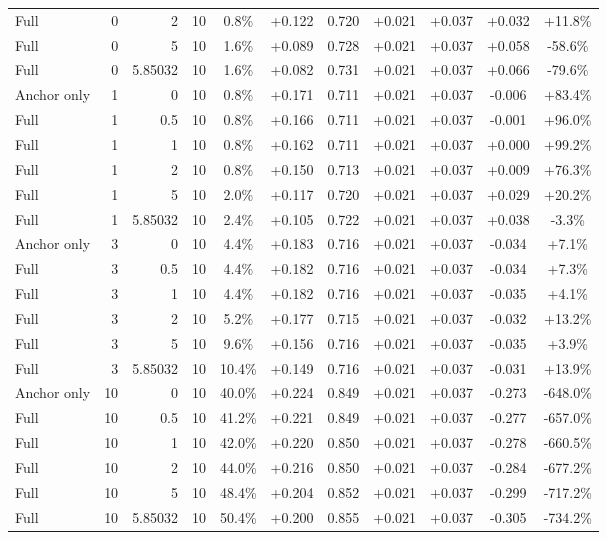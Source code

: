 \begin{table}[htbp]
\begin{tabular}{lrrrccccccc}
Full & 0 & 2 & 10 & 0.8\% & +0.122 & 0.720 & +0.021 & +0.037 & +0.032 & +11.8\% \\
Full & 0 & 5 & 10 & 1.6\% & +0.089 & 0.728 & +0.021 & +0.037 & +0.058 & -58.6\% \\
Full & 0 & 5.85032 & 10 & 1.6\% & +0.082 & 0.731 & +0.021 & +0.037 & +0.066 & -79.6\% \\
Anchor only & 1 & 0 & 10 & 0.8\% & +0.171 & 0.711 & +0.021 & +0.037 & -0.006 & +83.4\% \\
Full & 1 & 0.5 & 10 & 0.8\% & +0.166 & 0.711 & +0.021 & +0.037 & -0.001 & +96.0\% \\
Full & 1 & 1 & 10 & 0.8\% & +0.162 & 0.711 & +0.021 & +0.037 & +0.000 & +99.2\% \\
Full & 1 & 2 & 10 & 0.8\% & +0.150 & 0.713 & +0.021 & +0.037 & +0.009 & +76.3\% \\
Full & 1 & 5 & 10 & 2.0\% & +0.117 & 0.720 & +0.021 & +0.037 & +0.029 & +20.2\% \\
Full & 1 & 5.85032 & 10 & 2.4\% & +0.105 & 0.722 & +0.021 & +0.037 & +0.038 & -3.3\% \\
Anchor only & 3 & 0 & 10 & 4.4\% & +0.183 & 0.716 & +0.021 & +0.037 & -0.034 & +7.1\% \\
Full & 3 & 0.5 & 10 & 4.4\% & +0.182 & 0.716 & +0.021 & +0.037 & -0.034 & +7.3\% \\
Full & 3 & 1 & 10 & 4.4\% & +0.182 & 0.716 & +0.021 & +0.037 & -0.035 & +4.1\% \\
Full & 3 & 2 & 10 & 5.2\% & +0.177 & 0.715 & +0.021 & +0.037 & -0.032 & +13.2\% \\
Full & 3 & 5 & 10 & 9.6\% & +0.156 & 0.716 & +0.021 & +0.037 & -0.035 & +3.9\% \\
Full & 3 & 5.85032 & 10 & 10.4\% & +0.149 & 0.716 & +0.021 & +0.037 & -0.031 & +13.9\% \\
Anchor only & 10 & 0 & 10 & 40.0\% & +0.224 & 0.849 & +0.021 & +0.037 & -0.273 & -648.0\% \\
Full & 10 & 0.5 & 10 & 41.2\% & +0.221 & 0.849 & +0.021 & +0.037 & -0.277 & -657.0\% \\
Full & 10 & 1 & 10 & 42.0\% & +0.220 & 0.850 & +0.021 & +0.037 & -0.278 & -660.5\% \\
Full & 10 & 2 & 10 & 44.0\% & +0.216 & 0.850 & +0.021 & +0.037 & -0.284 & -677.2\% \\
Full & 10 & 5 & 10 & 48.4\% & +0.204 & 0.852 & +0.021 & +0.037 & -0.299 & -717.2\% \\
Full & 10 & 5.85032 & 10 & 50.4\% & +0.200 & 0.855 & +0.021 & +0.037 & -0.305 & -734.2\% \\

\end{tabular}
\end{table}
